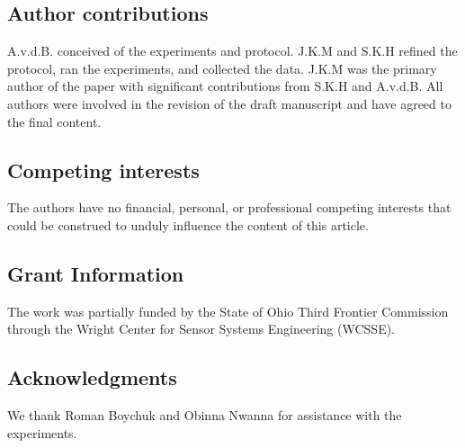 \documentclass[fleqn,10pt]{wlpeerj}
\begin{document}
\subsection*{Author contributions}
A.v.d.B. conceived of the experiments and protocol. J.K.M and S.K.H refined the
protocol, ran the experiments, and collected the data. J.K.M was the primary
author of the paper with significant contributions from S.K.H and A.v.d.B. All
authors were involved in the revision of the draft manuscript and have agreed
to the final content.

\subsection*{Competing interests}
The authors have no  financial, personal, or professional competing interests
that could be construed to unduly influence the content of this article.

\subsection*{Grant Information}
The work was partially funded by the State of Ohio Third Frontier Commission
through the Wright Center for Sensor Systems Engineering (WCSSE).

\subsection*{Acknowledgments}
We thank Roman Boychuk and Obinna Nwanna for assistance with the experiments.


\end{document}
